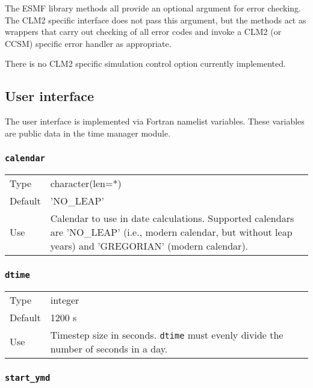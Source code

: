 \documentclass[12pt]{article}
\newcommand{\code}[1]{\texttt{#1}}
\begin{document}
The ESMF library methods all provide an optional argument for error
checking.  The CLM2 specific interface does not pass this argument, but the
methods act as wrappers that carry out checking of all error codes and
invoke a CLM2 (or CCSM) specific error handler as appropriate.

There is no CLM2 specific simulation control option currently implemented.

\subsection{User interface}

The user interface is implemented via Fortran namelist variables.  These
variables are public data in the time manager module.

\subsubsection{\code{calendar}}

\begin{tabular}{lp{5.5in}}
Type    & character(len=*) \\
Default & 'NO\_LEAP'  \\
Use     &  
Calendar to use in date calculations.  Supported calendars are 'NO\_LEAP'
(i.e., modern calendar, but without leap years) and 'GREGORIAN' (modern
calendar).
\end{tabular}

\subsubsection{\code{dtime}}

\begin{tabular}{lp{5.5in}}
Type    & integer \\
Default & 1200 s \\
Use     &  
Timestep size in seconds.  \code{dtime} must evenly divide the number of
seconds in a day.
\end{tabular}

\subsubsection{\code{start\_ymd}}
\end{document}
